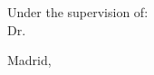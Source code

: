 \begin{center}
\begin{spacing}{1.3}
\textbf{\Large {\thesisAuthor}}\\
{\large {\priorstudies}}\\
\end{spacing}
\end{center}

\vspace{5 mm}
\begin{center}
\begin{spacing}{1.3}
{Under the supervision of:}\\
    {\large {Dr. \supervisor}}\\
\end{spacing}
\end{center}

\vspace{15 mm}
\begin{center}
    \large {Madrid, \thesisDate}
\end{center}

